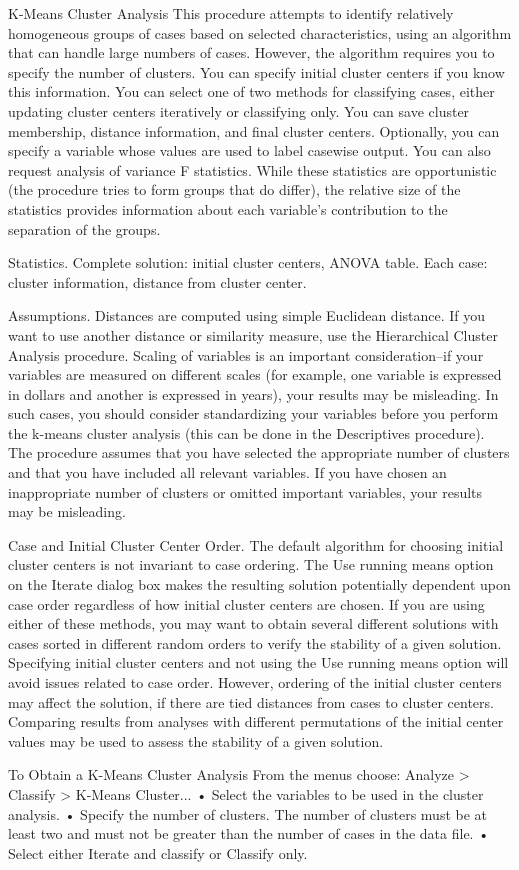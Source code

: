  
K-Means Cluster Analysis 
This procedure attempts to identify relatively homogeneous groups of cases based on selected characteristics, using an algorithm that can handle large numbers of cases. However, the algorithm requires you to specify the number of clusters. You can specify initial cluster centers if you know this information. You can select one of two methods for classifying cases, either updating cluster centers iteratively or classifying only. You can save cluster membership, distance information, and final cluster centers. Optionally, you can specify a variable whose values are used to label casewise output. You can also request analysis of variance F statistics. While these statistics are opportunistic (the procedure tries to form groups that do differ), the relative size of the statistics provides information about each variable's contribution to the separation of the groups.

Statistics. Complete solution: initial cluster centers, ANOVA table.  Each case: cluster information, distance from cluster center.

Assumptions. Distances are computed using simple Euclidean distance. If you want to use another distance or similarity measure, use the Hierarchical Cluster Analysis procedure. Scaling of variables is an important consideration--if your variables are measured on different scales (for example, one variable is expressed in dollars and another is expressed in years), your results may be misleading. In such cases, you should consider standardizing your variables before you perform the k-means cluster analysis (this can be done in the Descriptives procedure). The procedure assumes that you have selected the appropriate number of clusters and that you have included all relevant variables. If you have chosen an inappropriate number of clusters or omitted important variables, your results may be misleading.

Case and Initial Cluster Center Order. The default algorithm for choosing initial cluster centers is not invariant to case ordering. The Use running means option on the Iterate dialog box makes the resulting solution potentially dependent upon case order regardless of how initial cluster centers are chosen. If you are using either of these methods, you may want to obtain several different solutions with cases sorted in different random orders to verify the stability of a given solution. Specifying initial cluster centers and not using the Use running means option will avoid issues related to case order. However, ordering of the initial cluster centers may affect the solution, if there are tied distances from cases to cluster centers. Comparing results from analyses with different permutations of the initial center values may be used to assess the stability of a given solution.

To Obtain a K-Means Cluster Analysis
From the menus choose:
Analyze  >  Classify  >  K-Means Cluster...
•	Select the variables to be used in the cluster analysis. 
•	Specify the number of clusters. The number of clusters must be at least two and must not be greater than the number of cases in the data file.
•	Select either Iterate and classify or Classify only.




